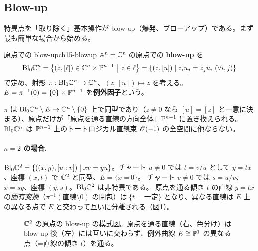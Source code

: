 \subsection{Blow-up}

特異点を「取り除く」基本操作が blow-up（爆発、ブローアップ）である。まず最も簡単な場合から始める。

\begin{mydef}{原点での blow-up}{ch15-blowup}
$\mathbb{A}^n = \mathbb{C}^n$ の原点での \textbf{blow-up} を
\[
\mathrm{Bl}_0\mathbb{C}^n = \big\{(z,[\ell])\in\mathbb{C}^n\times\mathbb{P}^{n-1}\ \big|\ z\in\ell\big\}
= \{(z,[u])\mid z_iu_j = z_ju_i\ (\forall i,j)\}
\]
で定め、射影 $\pi:\mathrm{Bl}_0\mathbb{C}^n\to\mathbb{C}^n$、$(z,[u])\mapsto z$ を考える。$E = \pi^{-1}(0) = \{0\}\times\mathbb{P}^{n-1}$ を\textbf{例外因子}という。
\end{mydef}

$\pi$ は $\mathrm{Bl}_0\mathbb{C}^n\setminus E\to\mathbb{C}^n\setminus\{0\}$ 上で同型であり（$z\neq0$ なら $[u] = [z]$ と一意に決まる）、原点だけが「原点を通る直線の方向全体」$\mathbb{P}^{n-1}$ に置き換えられる。
$\mathrm{Bl}_0\mathbb{C}^n$ は $\mathbb{P}^{n-1}$ 上のトートロジカル直線束 $\mathscr{O}(-1)$ の全空間に他ならない。

\paragraph{$n = 2$ の場合.}
$\mathrm{Bl}_0\mathbb{C}^2 = \{((x,y),[u:v])\mid xv = yu\}$。チャート $u\neq0$ では $t = v/u$ として $y = tx$、座標 $(x,t)$ で $\mathbb{C}^2$ と同型、$E = \{x = 0\}$。
チャート $v\ne0$ では $s = u/v$、$x = sy$、座標 $(y,s)$。$\mathrm{Bl}_0\mathbb{C}^2$ は非特異である。
原点を通る傾き $t$ の直線 $y = tx$ の\emph{固有変換}（$\pi^{-1}(\text{直線}\setminus 0)$ の閉包）は $\{t = \text{一定}\}$ となり、異なる直線は $E$ 上の異なる点で $E$ と交わって互いに分離される（図\ref{fig:ch15-blowup}）。

\begin{figure}[H]
\centering
{}
\caption{$\mathbb{C}^2$ の原点の blow-up の模式図。原点を通る直線（右、色分け）は blow-up 後（左）には互いに交わらず、例外曲線 $E\cong\mathbb{P}^1$ の異なる点（=直線の傾き $t$）を通る。}
\label{fig:ch15-blowup}
\end{figure}

